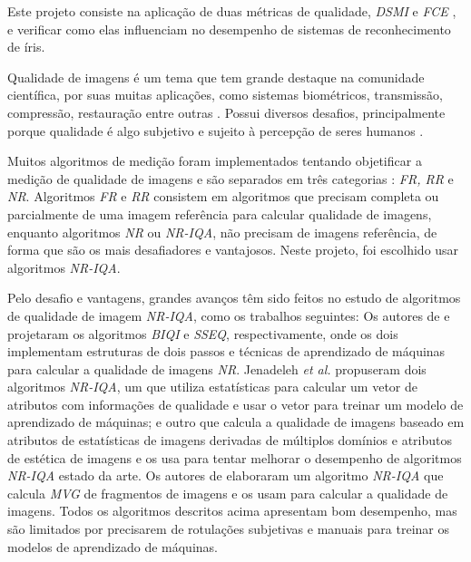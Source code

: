 \par Este projeto consiste na aplicação de duas métricas de qualidade, \textit{\acrfull{DSMI}} \cite{Jenadeleh_2018_CVPR_Workshops} e \textit{\acrfull{FCE}} \cite{du2010}, e verificar como elas influenciam no desempenho de sistemas de reconhecimento de íris.

\par Qualidade de imagens é um tema que tem grande destaque na comunidade científica, por suas muitas aplicações, como sistemas biométricos, transmissão, compressão, restauração entre outras \cite{zhang2015}. Possui diversos desafios, principalmente porque qualidade é algo subjetivo e sujeito à percepção de seres humanos \cite{xu2016}. 

\par Muitos algoritmos de medição foram implementados tentando objetificar a medição de qualidade de imagens e são separados em três categorias \cite{xu2016}: \textit{\acrfull{FR}, \acrfull{RR}} e \textit{\acrfull{NR}}. Algoritmos \textit{\acrshort{FR}} e \textit{RR} consistem em algoritmos que precisam completa ou parcialmente de uma imagem referência para calcular qualidade de imagens, enquanto algoritmos \textit{\acrshort{NR}} ou \textit{\acrfull{NR-IQA}}, não precisam de imagens referência, de forma que são os mais desafiadores e vantajosos. Neste projeto, foi escolhido usar algoritmos \textit{\acrshort{NR-IQA}}.

\par Pelo desafio e vantagens, grandes avanços têm sido feitos no estudo de algoritmos de qualidade de imagem \textit{\acrshort{NR-IQA}}, como os trabalhos seguintes: Os autores de \cite{moorthy2010} e \cite{liu2014} projetaram os algoritmos \textit{\acrfull{BIQI}} e \textit{\acrfull{SSEQ}}, respectivamente, onde os dois implementam estruturas de dois passos e técnicas de aprendizado de máquinas para calcular a qualidade de imagens \textit{\acrshort{NR}}. Jenadeleh \textit{et al.} \cite{jenadeleh2016, jenadeleh2017} propuseram dois algoritmos \textit{\acrshort{NR-IQA}}, um que utiliza estatísticas para calcular um vetor de atributos com informações de qualidade e usar o vetor para treinar um modelo de aprendizado de máquinas; e outro que calcula a qualidade de imagens baseado em atributos de estatísticas de imagens derivadas de múltiplos domínios e atributos de estética de imagens e os usa para tentar melhorar o desempenho de algoritmos \textit{\acrshort{NR-IQA}} estado da arte. Os autores de \cite{zhang2015} elaboraram um algoritmo \textit{\acrshort{NR-IQA}} que calcula \textit{\acrfull{MVG}} de fragmentos de imagens e os usam para calcular a qualidade de imagens. Todos os algoritmos descritos acima apresentam bom desempenho, mas são limitados por precisarem de rotulações subjetivas e manuais para treinar os modelos de aprendizado de máquinas.

